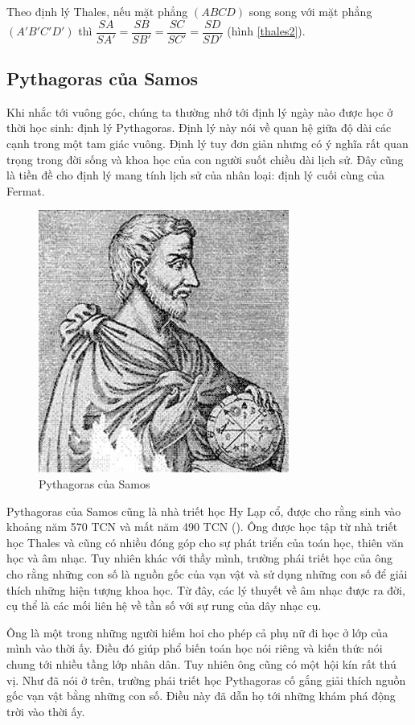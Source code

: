 Theo định lý Thales, nếu mặt phẳng $(ABCD)$ song song với mặt phẳng $(A'B'C'D')$ thì $\dfrac{SA}{SA'} = \dfrac{SB}{SB'} = \dfrac{SC}{SC'} = \dfrac{SD}{SD'}$ (hình \ref{thales2}).

\subsection{Pythagoras của Samos}

Khi nhắc tới vuông góc, chúng ta thường nhớ tới định lý ngày nào được học ở thời học sinh: định lý Pythagoras. Định lý này nói về quan hệ giữa độ dài các cạnh trong một tam giác vuông. Định lý tuy đơn giản nhưng có ý nghĩa rất quan trọng trong đời sống và khoa học của con người suốt chiều dài lịch sử. Đây cũng là tiền đề cho định lý mang tính lịch sử của nhân loại: định lý cuối cùng của Fermat.

\begin{figure}[ht]
	\centering
	\includegraphics[scale=0.5]{analytic_geometry/Pythagoras.jpeg}
	\caption{Pythagoras của Samos}
\end{figure}

Pythagoras của Samos cũng là nhà triết học Hy Lạp cổ, được cho rằng sinh vào khoảng năm 570 TCN và mất năm  490 TCN (\cite{MacTutorPythagoras}). Ông được học tập từ nhà triết học Thales và cũng có nhiều đóng góp cho sự phát triển của toán học, thiên văn học và âm nhạc. Tuy nhiên khác với thầy mình, trường phái triết học của ông cho rằng những con số là nguồn gốc của vạn vật và sử dụng những con số để giải thích những hiện tượng khoa học. Từ đây, các lý thuyết về âm nhạc được ra đời, cụ thể là các mối liên hệ về tần số với sự rung của dây nhạc cụ.

Ông là một trong những người hiếm hoi cho phép cả phụ nữ đi học ở lớp của mình vào thời ấy. Điều đó giúp phổ biến toán học nói riêng và kiến thức nói chung tới nhiều tầng lớp nhân dân. Tuy nhiên ông cũng có một hội kín rất thú vị. Như đã nói ở trên, trường phái triết học Pythagoras cố gắng giải thích nguồn gốc vạn vật bằng những con số. Điều này đã dẫn họ tới những khám phá động trời vào thời ấy.

